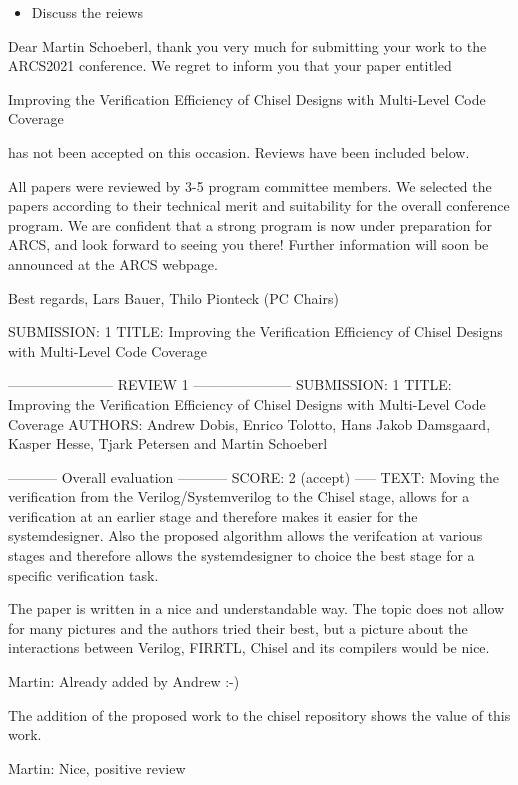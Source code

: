 \documentclass[runningheads]{llncs}
\newcommand{\martin}[1]{{\color{blue} Martin: #1}}
\begin{document}
\begin{itemize}
\item Discuss the reiews
\end{itemize}

Dear Martin Schoeberl,
thank you very much for submitting your work to the ARCS2021 conference. We regret to inform you that your paper entitled

Improving the Verification Efficiency of Chisel Designs with Multi-Level Code Coverage

has not been accepted on this occasion. Reviews have been included below.

All papers were reviewed by 3-5 program committee members. We selected the papers according to their technical merit and suitability for the overall conference program. We are confident that a strong program is now under preparation for ARCS, and look forward to seeing you there! Further information will soon be announced at the ARCS webpage.

Best regards,
Lars Bauer, Thilo Pionteck (PC Chairs)

SUBMISSION: 1
TITLE: Improving the Verification Efficiency of Chisel Designs with Multi-Level Code Coverage


----------------------- REVIEW 1 ---------------------
SUBMISSION: 1
TITLE: Improving the Verification Efficiency of Chisel Designs with Multi-Level Code Coverage
AUTHORS: Andrew Dobis, Enrico Tolotto, Hans Jakob Damsgaard, Kasper Hesse, Tjark Petersen and Martin Schoeberl

----------- Overall evaluation -----------
SCORE: 2 (accept)
----- TEXT:
Moving the verification from the Verilog/Systemverilog to the Chisel stage, allows for a verification at an earlier stage and therefore makes it easier for the systemdesigner.
Also the proposed algorithm allows the verifcation at various stages and therefore allows the systemdesigner to choice the best stage for a specific verification task.

The paper is written in a nice and understandable way. The topic does not allow for many pictures and the authors tried their best, but a picture about the interactions between Verilog, FIRRTL, Chisel and its compilers would be nice.

\martin{Already added by Andrew :-)}

The addition of the proposed work to the chisel repository shows the value of this work.

\martin{Nice, positive review}
\end{document}
